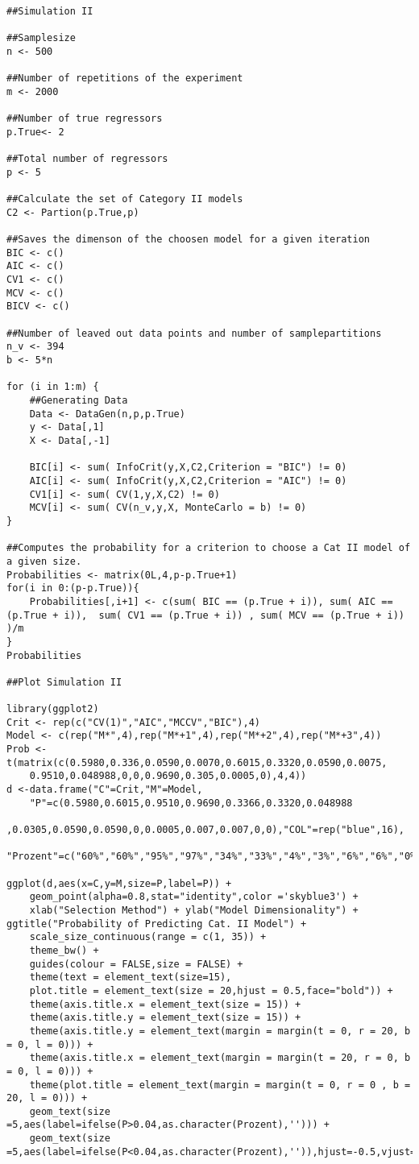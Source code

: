 \documentclass[Research_Module_ES.tex]{subfiles}
\begin{document}
\begin{lstlisting}[title={Simulation II}]
##Simulation II 

##Samplesize
n <- 500

##Number of repetitions of the experiment
m <- 2000

##Number of true regressors 
p.True<- 2

##Total number of regressors
p <- 5

##Calculate the set of Category II models
C2 <- Partion(p.True,p)

##Saves the dimenson of the choosen model for a given iteration
BIC <- c()
AIC <- c()
CV1 <- c()
MCV <- c()
BICV <- c()

##Number of leaved out data points and number of samplepartitions
n_v <- 394
b <- 5*n

for (i in 1:m) {
	##Generating Data
	Data <- DataGen(n,p,p.True)
	y <- Data[,1]
	X <- Data[,-1]

	BIC[i] <- sum( InfoCrit(y,X,C2,Criterion = "BIC") != 0)
	AIC[i] <- sum( InfoCrit(y,X,C2,Criterion = "AIC") != 0)
	CV1[i] <- sum( CV(1,y,X,C2) != 0)
	MCV[i] <- sum( CV(n_v,y,X, MonteCarlo = b) != 0)
}

##Computes the probability for a criterion to choose a Cat II model of a given size.
Probabilities <- matrix(0L,4,p-p.True+1)
for(i in 0:(p-p.True)){
	Probabilities[,i+1] <- c(sum( BIC == (p.True + i)), sum( AIC == (p.True + i)),  sum( CV1 == (p.True + i)) , sum( MCV == (p.True + i)) )/m
}
Probabilities

##Plot Simulation II

library(ggplot2)
Crit <- rep(c("CV(1)","AIC","MCCV","BIC"),4)
Model <- c(rep("M*",4),rep("M*+1",4),rep("M*+2",4),rep("M*+3",4))
Prob <- t(matrix(c(0.5980,0.336,0.0590,0.0070,0.6015,0.3320,0.0590,0.0075,
	0.9510,0.048988,0,0,0.9690,0.305,0.0005,0),4,4))
d <-data.frame("C"=Crit,"M"=Model,
	"P"=c(0.5980,0.6015,0.9510,0.9690,0.3366,0.3320,0.048988
	,0.0305,0.0590,0.0590,0,0.0005,0.007,0.007,0,0),"COL"=rep("blue",16),
	"Prozent"=c("60%","60%","95%","97%","34%","33%","4%","3%","6%","6%","0%","0%","0.7%","0.8%","0%","0%"))

ggplot(d,aes(x=C,y=M,size=P,label=P)) +
	geom_point(alpha=0.8,stat="identity",color ='skyblue3') +
	xlab("Selection Method") + ylab("Model Dimensionality") + ggtitle("Probability of Predicting Cat. II Model") +
	scale_size_continuous(range = c(1, 35)) +
	theme_bw() +
	guides(colour = FALSE,size = FALSE) +
	theme(text = element_text(size=15),
	plot.title = element_text(size = 20,hjust = 0.5,face="bold")) +
	theme(axis.title.x = element_text(size = 15)) +
	theme(axis.title.y = element_text(size = 15)) +
	theme(axis.title.y = element_text(margin = margin(t = 0, r = 20, b = 0, l = 0))) +
	theme(axis.title.x = element_text(margin = margin(t = 20, r = 0, b = 0, l = 0))) +
	theme(plot.title = element_text(margin = margin(t = 0, r = 0 , b = 20, l = 0))) +
	geom_text(size =5,aes(label=ifelse(P>0.04,as.character(Prozent),''))) +
	geom_text(size =5,aes(label=ifelse(P<0.04,as.character(Prozent),'')),hjust=-0.5,vjust=0.5)

\end{lstlisting}
\end{document}
